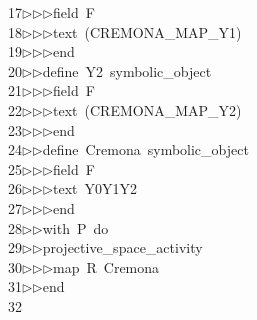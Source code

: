 \begin{tabbing}
17\>$\triangleright$\>$\triangleright$\>$\triangleright$\>field\ F\ \\[0pt]
18\>$\triangleright$\>$\triangleright$\>$\triangleright$\>text\ (CREMONA\_MAP\_Y1)\ \\[0pt]
19\>$\triangleright$\>$\triangleright$\>$\triangleright$\>end\ \\[0pt]
20\>$\triangleright$\>$\triangleright$\>define\ Y2\ symbolic\_object\ \\[0pt]
21\>$\triangleright$\>$\triangleright$\>$\triangleright$\>field\ F\ \\[0pt]
22\>$\triangleright$\>$\triangleright$\>$\triangleright$\>text\ (CREMONA\_MAP\_Y2)\ \\[0pt]
23\>$\triangleright$\>$\triangleright$\>$\triangleright$\>end\ \\[0pt]
24\>$\triangleright$\>$\triangleright$\>define\ Cremona\ symbolic\_object\ \\[0pt]
25\>$\triangleright$\>$\triangleright$\>$\triangleright$\>field\ F\ \\[0pt]
26\>$\triangleright$\>$\triangleright$\>$\triangleright$\>text\ Y0Y1Y2\ \\[0pt]
27\>$\triangleright$\>$\triangleright$\>$\triangleright$\>end\ \\[0pt]
28\>$\triangleright$\>$\triangleright$\>with\ P\ do\ \\[0pt]
29\>$\triangleright$\>$\triangleright$\>projective\_space\_activity\ \\[0pt]
30\>$\triangleright$\>$\triangleright$\>$\triangleright$\>map\ R\ Cremona\ \ \\[0pt]
31\>$\triangleright$\>$\triangleright$\>end\\[0pt]
32\>\end{tabbing}

